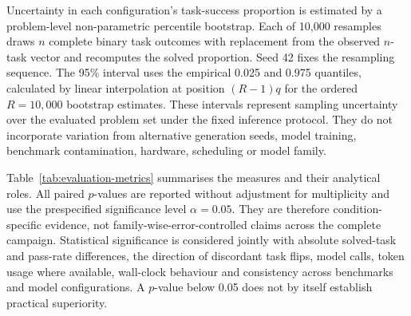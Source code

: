 Uncertainty in each configuration's task-success proportion is estimated by a problem-level non-parametric percentile bootstrap. Each of 10,000 resamples draws $n$ complete binary task outcomes with replacement from the observed $n$-task vector and recomputes the solved proportion. Seed 42 fixes the resampling sequence. The 95\% interval uses the empirical 0.025 and 0.975 quantiles, calculated by linear interpolation at position $(R-1)q$ for the ordered $R=10{,}000$ bootstrap estimates. These intervals represent sampling uncertainty over the evaluated problem set under the fixed inference protocol. They do not incorporate variation from alternative generation seeds, model training, benchmark contamination, hardware, scheduling or model family.

Table~\ref{tab:evaluation-metrics} summarises the measures and their analytical roles. All paired $p$-values are reported without adjustment for multiplicity and use the prespecified significance level $\alpha=0.05$. They are therefore condition-specific evidence, not family-wise-error-controlled claims across the complete campaign. Statistical significance is considered jointly with absolute solved-task and pass-rate differences, the direction of discordant task flips, model calls, token usage where available, wall-clock behaviour and consistency across benchmarks and model configurations. A $p$-value below 0.05 does not by itself establish practical superiority.

